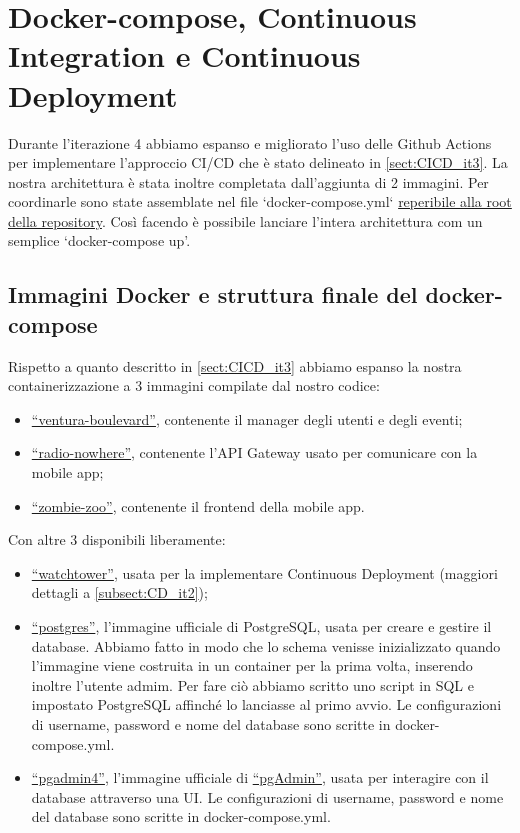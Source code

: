\section{Docker-compose, Continuous Integration e Continuous Deployment}
Durante l'iterazione 4 abbiamo espanso e migliorato l'uso delle Github Actions per implementare l'approccio CI/CD che è stato delineato in \ref{sect:CICD_it3}.
La nostra architettura è stata inoltre completata dall'aggiunta di 2 immagini. Per coordinarle sono state assemblate nel file `docker-compose.yml` \href{https://github.com/FI-153/Progetto-PAC-2023-24/blob/main/docker-compose.yml}{reperibile alla root della repository}. Così facendo è possibile lanciare l'intera architettura com un semplice `docker-compose up'.
\subsection{Immagini Docker e struttura finale del docker-compose}
Rispetto a quanto descritto in \ref{sect:CICD_it3} abbiamo espanso la nostra containerizzazione a 3 immagini compilate dal nostro codice:
\begin{itemize}
  \item \href{https://hub.docker.com/repository/docker/freddy153/ventura_boulevard/general}{``ventura-boulevard''}, contenente il manager degli utenti e degli eventi;
  \item \href{https://hub.docker.com/repository/docker/freddy153/radio_nowhere/general}{``radio-nowhere''}, contenente l'API Gateway usato per comunicare con la mobile app;
  \item \href{https://hub.docker.com/repository/docker/freddy153/zombie_zoo/general}{``zombie-zoo''}, contenente il frontend della mobile app.
\end{itemize}
Con altre 3 disponibili liberamente:
\begin{itemize}
  \item \href{https://github.com/containrrr/watchtower}{``watchtower''}, usata per la implementare Continuous Deployment (maggiori dettagli a \ref{subsect:CD_it2});
  \item \href{https://hub.docker.com/_/postgres}{``postgres''}, l'immagine ufficiale di PostgreSQL, usata per creare e gestire il database. Abbiamo fatto in modo che lo schema venisse inizializzato quando l'immagine viene costruita in un container per la prima volta, inserendo inoltre l'utente admim. Per fare ciò abbiamo scritto uno script in SQL e impostato PostgreSQL affinché lo lanciasse al primo avvio. Le configurazioni di username, password e nome del database sono scritte in docker-compose.yml.
  \item \href{https://hub.docker.com/r/dpage/pgadmin4/}{``pgadmin4''}, l'immagine ufficiale di \href{https://www.pgadmin.org}{``pgAdmin''}, usata per interagire con il database attraverso una UI. Le configurazioni di username, password e nome del database sono scritte in docker-compose.yml.
\end{itemize}
\newpage
